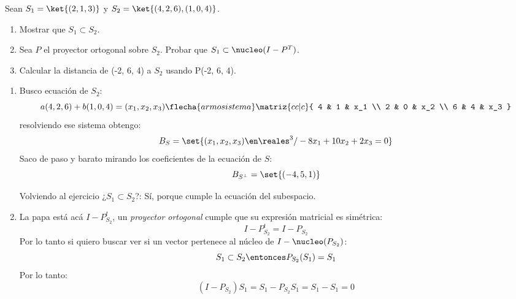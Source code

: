 \begin{enunciado}{\ejExtra}
  Sean $S_1 = \ket{(2,1,3)}$ y $S_2 = \ket{(4,2,6), (1,0,4)}$.
  \begin{enumerate}[label=\alph*)]
    \item Mostrar que $S_1 \subset S_2$.

    \item Sea $P$ el proyector ortogonal sobre $S_2$. Probar que $S_1 \subset \nucleo(I - P^T)$.

    \item Calcular la distancia de (-2, 6, 4) a $S_2$ usando P(-2, 6, 4).
  \end{enumerate}
\end{enunciado}

\begin{enumerate}[label=\alph*)]
  \item Busco ecuación  de $S_2$:
        $$
          a (4,2,6) + b (1,0,4) = (x_1, x_2, x_3)
          \flecha{armo sistema}
          \matriz{cc|c}{
            4 & 1 & x_1 \\
            2 & 0 & x_2 \\
            6 & 4 & x_3
          }
        $$
        resolviendo ese sistema obtengo:
        $$
          B_S = \set{(x_1, x_2, x_3) \en \reales^3 / -8x_1 + 10x_2 + 2x_3 = 0}
        $$
        Saco de paso y barato mirando los coeficientes de la ecuación de $S$:
        $$
          B_{S^\perp} = \set{(-4, 5, 1)}
        $$

        Volviendo al ejercicio ¿$S_1 \subset S_2$?: Sí, porque cumple la ecuación del subespacio.

  \item La papa está acá $I - P_{S_2}^t$, un \textit{proyector ortogonal} cumple que su expresión matricial es simétrica:
        $$
          I - P_{S_2}^t = I - P_{S_2}
        $$
        Por lo tanto si quiero buscar ver si un vector pertenece al núcleo de $I- \nucleo(P_{S_2})$:
        $$
          S_1 \subset S_2
          \entonces
          P_{S_2}(S_1) = S_1
        $$
        Por lo tanto:
        $$
          (I - P_{S_2})S_1 = S_1 - P_{S_2}S_1 = S_1 - S_1 = 0
        $$


\end{enumerate}

